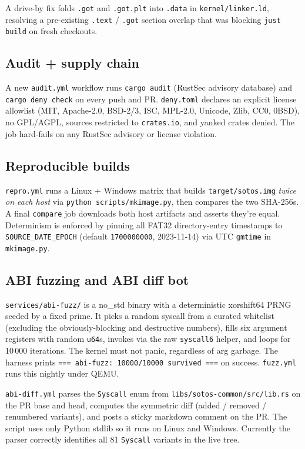 \documentclass[11pt,a4paper]{article}
\begin{document}
A drive-by fix folds \texttt{.got} and \texttt{.got.plt} into
\texttt{.data} in \texttt{kernel/linker.ld}, resolving a pre-existing
\texttt{.text} / \texttt{.got} section overlap that was blocking
\texttt{just build} on fresh checkouts.

\subsection{Audit + supply chain}

A new \texttt{audit.yml} workflow runs \texttt{cargo audit} (RustSec
advisory database) and \texttt{cargo deny check} on every push and PR.
\texttt{deny.toml} declares an explicit license allowlist
(MIT, Apache-2.0, BSD-2/3, ISC, MPL-2.0, Unicode, Zlib, CC0, 0BSD), no
GPL/AGPL, sources restricted to \texttt{crates.io}, and yanked crates
denied. The job hard-fails on any RustSec advisory or license
violation.

\subsection{Reproducible builds}

\texttt{repro.yml} runs a Linux + Windows matrix that builds
\texttt{target/sotos.img} \emph{twice on each host} via
\texttt{python scripts/mkimage.py}, then compares the two SHA-256s.
A final \texttt{compare} job downloads both host artifacts and
asserts they're equal. Determinism is enforced by pinning all FAT32
directory-entry timestamps to \texttt{SOURCE\_DATE\_EPOCH} (default
\texttt{1700000000}, 2023-11-14) via UTC \texttt{gmtime} in
\texttt{mkimage.py}.

\subsection{ABI fuzzing and ABI diff bot}

\texttt{services/abi-fuzz/} is a no\_std binary with a deterministic
xorshift64 PRNG seeded by a fixed prime. It picks a random syscall
from a curated whitelist (excluding the obviously-blocking and
destructive numbers), fills six argument registers with random
\texttt{u64}s, invokes via the raw \texttt{syscall6} helper, and loops
for 10\,000 iterations. The kernel must not panic, regardless of arg
garbage. The harness prints \verb|=== abi-fuzz: 10000/10000 survived ===|
on success. \texttt{fuzz.yml} runs this nightly under QEMU.

\texttt{abi-diff.yml} parses the \texttt{Syscall} enum from
\texttt{libs/sotos-common/src/lib.rs} on the PR base and head, computes
the symmetric diff (added / removed / renumbered variants), and posts
a sticky markdown comment on the PR. The script uses only Python
stdlib so it runs on Linux and Windows. Currently the parser correctly
identifies all 81 \texttt{Syscall} variants in the live tree.
\end{document}
